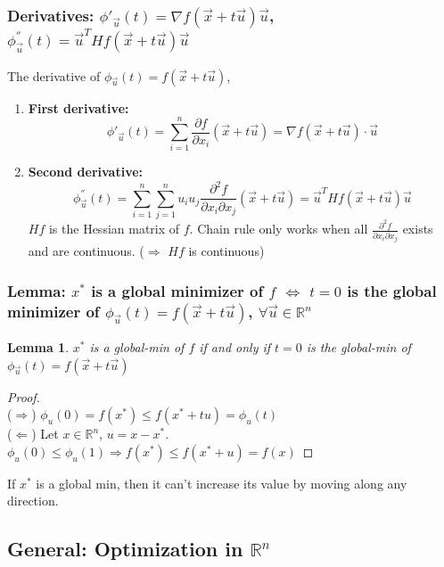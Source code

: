 \documentclass[11pt,a4paper]{article}
\newtheorem{lemma}{Lemma}
\begin{document}
\subsubsection{Derivatives: $\phi'_{\vec{u}}(t)=\nabla f(\vec{x}+t\vec{u})\vec{u}$, $\phi^{''}_{\vec{u}} (t)=\vec{u}^T {Hf}(\vec{x}+t\vec{u})\vec{u}$}
The derivative of $\phi_{\vec{u}}(t)=f(\vec{x}+t\vec{u})$,
\begin{enumerate}
    \item \textbf{First derivative:}$$\phi'_{\vec{u}}(t)=\sum_{i=1}^n \frac{\partial f}{\partial x_i}(\vec{x}+t\vec{u})=\nabla f(\vec{x}+t\vec{u})\cdot \vec{u}$$
    \item \textbf{Second derivative:} $$\phi^{''}_{\vec{u}} (t)=\sum_{i=1}^n \sum_{j=1}^n u_iu_j\frac{\partial^2 f}{\partial x_i\partial x_j}(\vec{x}+t\vec{u})=\vec{u}^T {Hf}(\vec{x}+t\vec{u})\vec{u}$$
    $Hf$ is the Hessian matrix of $f$. Chain rule only works when all $\frac{\partial^2 f}{\partial x_i\partial x_j}$ exists and are continuous. ($\Rightarrow$ $Hf$ is continuous)
\end{enumerate}

\subsubsection{Lemma: $x^*$ is a global minimizer of $f$ $\Leftrightarrow$ $t=0$ is the global minimizer of $\phi_{\vec{u}}(t)=f(\vec{x}+t\vec{u})$, $\forall \vec{u}\in \mathbb{R}^n$}
\begin{lemma}
    $x^*$ is a global-min of $f$ if and only if $t=0$ is the global-min of $\phi_{\vec{u}}(t)=f(\vec{x}+t\vec{u})$
\end{lemma}
\begin{proof}
\quad\\
($\Rightarrow$) $\phi_u (0)=f(x^*)\leq f(x^*+tu)=\phi_u (t)$\\
($\Leftarrow$) Let $x\in \mathbb{R}^n$, $u=x-x^*$. $\phi_u (0)\leq \phi_u (1) \Rightarrow f(x^*)\leq f(x^*+u)=f(x)$
\end{proof}
If $x^*$ is a global min, then it can't increase its value by moving along any direction.

\subsection{General: Optimization in $\mathbb{R}^n$}
\end{document}

